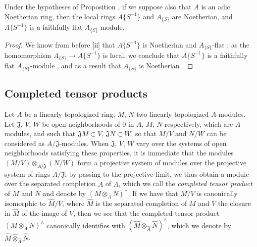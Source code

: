 \begin{corollary}[7.6.18]
\label{0.7.6.18}
Under the hypotheses of Proposition , if we suppose also that
$A$ is an adic Noetherian ring, then the local rings $A\{S^{-1}\}$ and $A_{\{S\}}$ are Noetherian,
and $A\{S^{-1}\}$ is a faithfully flat $A_{\{S\}}$-module.
\end{corollary}

\begin{proof}
\label{proof-0.7.6.18}
We know from before [ii] that $A\{S^{-1}\}$ is Noetherian and
$A_{\{S\}}$-flat ; as the homomorphism $A_{\{S\}}\to A\{S^{-1}\}$
is local, we conclude that $A\{S^{-1}\}$ is a faithfully flat $A_{\{S\}}$-module
, and as a result that $A_{\{S\}}$ is Noetherian .
\end{proof}

\subsection{Completed tensor products}
\label{subsection:0.7.7}

\begin{env}[7.7.1]
\label{0.7.7.1}
Let $A$ be a linearly topologized ring, $M$, $N$ two linearly topologized $A$-modules. Let
$\mathfrak{J}$, $V$, $W$ be open neighborhoods of $0$ in $A$, $M$, $N$ respectively, which are
$A$-modules, and such that $\mathfrak{J}M\subset V$, $\mathfrak{J}N\subset W$, so that
$M/V$ and $N/W$ can be considered as $A/\mathfrak{J}$-modules. When $\mathfrak{J}$, $V$, $W$
vary over the systems of open neighborhoods satisfying these properties, it is immediate that the
modules $(M/V)\otimes_{A/\mathfrak{J}}(N/W)$ form a projective system of modules
over the projective system of rings $A/\mathfrak{J}$; by passing to the projective limit, we
thus obtain a module over the separated completion $\widehat{A}$ of $A$, which we call the
\emph{completed tensor product} of $M$ and $N$ and denote by $(M\otimes_A N)^\wedge$. If we have
that $M/V$ is canonically isomorphic to $\widehat{M}/\overline{V}$, where $\widehat{M}$ is the
separated completion of $M$ and $\overline{V}$ the closure in $\widehat{M}$ of the image of $V$,
then we see that the completed tensor product $(M\otimes_A N)^\wedge$ canonically identifies with
$(\widehat{M}\otimes_{\widehat{A}}\widehat{N})^\wedge$, which we denote by $\widehat{M}\widehat{\otimes}_{\widehat{A}}\widehat{N}$.
\end{env}

